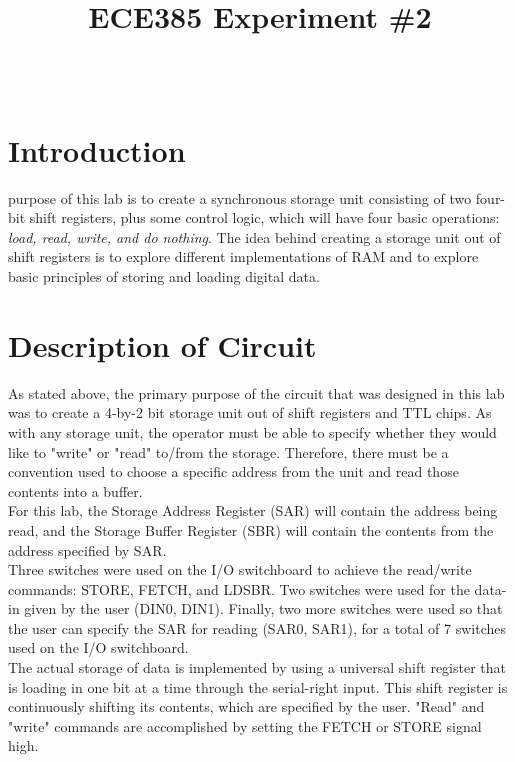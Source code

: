 \documentclass[journal, twocolumn, final,11pt,letterpaper]{IEEEtran}
\title{ECE385 Experiment \#2
	}
\author{
\IEEEauthorblockN{Eric Meyers, Ryan Helsdingen}\\
\IEEEauthorblockA{Section ABG; TAs: Ben Delay, Shuo Liu \\
February 3rd, 2016 \\
emeyer7, helsdin2\vspace{-10mm}}}
\begin{document}
	
\maketitle
\singlespacing

\vspace{-20mm}
\section{Introduction}
 purpose of this lab is to create a synchronous storage unit consisting of two four-bit shift registers, plus some control logic, which will have four basic operations: \emph{load, read, write, and do nothing}. The idea behind creating a storage unit out of shift registers is to explore different implementations of RAM and to explore basic principles of storing and loading digital data. 

\vspace{-4mm}

\section{Description of Circuit}
As stated above, the primary purpose of the circuit that was designed in this lab was to create a 4-by-2 bit storage unit out of shift registers and TTL chips. As with any storage unit, the operator must be able to specify whether they would like to "write" or "read" to/from the storage. Therefore, there must be a convention used to choose a specific address from the unit and read those contents into a buffer. \\

For this lab, the Storage Address Register (SAR) will contain the address being read, and the Storage Buffer Register (SBR) will contain the contents from the address specified by SAR. \\

Three switches were used on the I/O switchboard to achieve the read/write commands: STORE, FETCH, and LDSBR. Two switches were used for the data-in given by the user (DIN0, DIN1). Finally, two more switches were used so that the user can specify the SAR for reading (SAR0, SAR1), for a total of 7 switches used on the I/O switchboard. \\

The actual storage of data is implemented by using a universal shift register that is loading in one bit at a time through the serial-right input. This shift register is continuously shifting its contents, which are specified by the user. "Read" and "write" commands are accomplished by setting the FETCH or STORE signal high. \\
\end{document}
